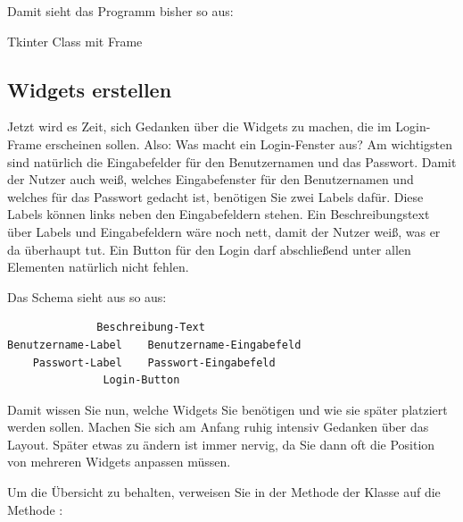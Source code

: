Damit sieht das Programm bisher so aus:

\begin{code}
     
     
     
     
     
    \caption{Tkinter Class mit Frame}\label{TkinterFrame}
\end{code}   


\subsection{Widgets erstellen}

Jetzt wird es Zeit, sich Gedanken über die Widgets zu machen, die im Login-Frame erscheinen sollen. Also: Was macht ein Login-Fenster aus? Am wichtigsten sind natürlich die Eingabefelder für den Benutzernamen und das Passwort. Damit der Nutzer auch weiß, welches Eingabefenster für den Benutzernamen und welches für das Passwort gedacht ist, benötigen Sie zwei Labels dafür. Diese Labels können links neben den Eingabefeldern stehen. Ein Beschreibungstext über Labels und Eingabefeldern wäre noch nett, damit der Nutzer weiß, was er da überhaupt tut. Ein Button für den Login darf abschließend unter allen Elementen natürlich nicht fehlen.

Das Schema sieht aus so aus:

\begin{lstlisting}
              Beschreibung-Text
Benutzername-Label    Benutzername-Eingabefeld
    Passwort-Label    Passwort-Eingabefeld
               Login-Button
\end{lstlisting}

\medskip

Damit wissen Sie nun, welche Widgets Sie benötigen und wie sie später platziert werden sollen. Machen Sie sich am Anfang ruhig intensiv Gedanken über das Layout. Später etwas zu ändern ist immer nervig, da Sie dann oft die Position von mehreren Widgets anpassen müssen.

Um die Übersicht zu behalten, verweisen Sie in der Methode  der Klasse  auf die Methode :

